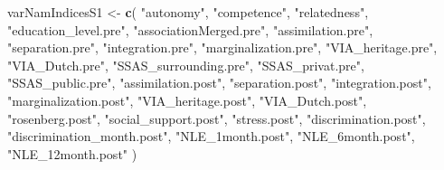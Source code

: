 \documentclass[
]{article}
\newenvironment{Shaded}{\begin{snugshade}}{\end{snugshade}}
\newcommand{\FunctionTok}[1]{\textcolor[rgb]{0.13,0.29,0.53}{\textbf{#1}}}
\newcommand{\NormalTok}[1]{#1}
\newcommand{\OtherTok}[1]{\textcolor[rgb]{0.56,0.35,0.01}{#1}}
\newcommand{\StringTok}[1]{\textcolor[rgb]{0.31,0.60,0.02}{#1}}
\begin{document}
\begin{Shaded}
\begin{Highlighting}[]
\NormalTok{varNamIndicesS1 }\OtherTok{\textless{}{-}} \FunctionTok{c}\NormalTok{(}
  \StringTok{"autonomy"}\NormalTok{,}
  \StringTok{"competence"}\NormalTok{,}
  \StringTok{"relatedness"}\NormalTok{,}
  \StringTok{"education\_level.pre"}\NormalTok{,}
  \StringTok{"associationMerged.pre"}\NormalTok{,}
  \StringTok{"assimilation.pre"}\NormalTok{,}
  \StringTok{"separation.pre"}\NormalTok{,}
  \StringTok{"integration.pre"}\NormalTok{,}
  \StringTok{"marginalization.pre"}\NormalTok{,}
  \StringTok{"VIA\_heritage.pre"}\NormalTok{,}
  \StringTok{"VIA\_Dutch.pre"}\NormalTok{,}
  \StringTok{"SSAS\_surrounding.pre"}\NormalTok{,}
  \StringTok{"SSAS\_privat.pre"}\NormalTok{,}
  \StringTok{"SSAS\_public.pre"}\NormalTok{,}
  \StringTok{"assimilation.post"}\NormalTok{,}
  \StringTok{"separation.post"}\NormalTok{,}
  \StringTok{"integration.post"}\NormalTok{,}
  \StringTok{"marginalization.post"}\NormalTok{,}
  \StringTok{"VIA\_heritage.post"}\NormalTok{,}
  \StringTok{"VIA\_Dutch.post"}\NormalTok{,}
  \StringTok{"rosenberg.post"}\NormalTok{,}
  \StringTok{"social\_support.post"}\NormalTok{,}
  \StringTok{"stress.post"}\NormalTok{,}
  \StringTok{"discrimination.post"}\NormalTok{,}
  \StringTok{"discrimination\_month.post"}\NormalTok{,}
  \StringTok{"NLE\_1month.post"}\NormalTok{,}
  \StringTok{"NLE\_6month.post"}\NormalTok{,}
  \StringTok{"NLE\_12month.post"}
\NormalTok{  )}


\end{Highlighting}
\end{Shaded}
\end{document}
